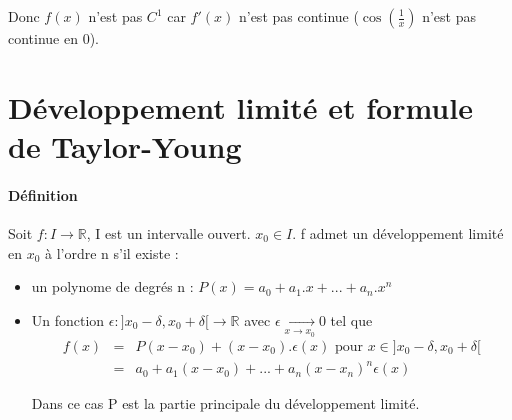 Donc $f(x)$ n'est pas $C^1$ car $f'(x)$ n'est pas continue ($\cos(\frac{1}{x})$ n'est pas continue en 0).

\section{Développement limité et formule de Taylor-Young}

\paragraph{Définition} Soit $f : I \rightarrow \mathbb{R}$, I est un intervalle ouvert. $x_0 \in I$.
f admet un développement limité en $x_0$ à l'ordre n s'il existe : 
\begin{itemize}
	\item un polynome de degrés n : $P(x) = a_0+a_1.x+...+a_n.x^n$
	\item Un fonction $\epsilon : ]x_0-\delta, x_0+\delta[ \rightarrow \mathbb{R}$ avec $\epsilon \xrightarrow[x \to x_0]{} 0$ tel que  \[ \begin{array}{rcl}
			f(x) &=& P(x-x_0)+(x-x_0).\epsilon(x) \text{ pour } x \in ]x_0-\delta, x_0+\delta[ \\
					   &=& a_0+a_1(x-x_0)+...+a_n(x-x_n)^n\epsilon(x) 
	\end{array}\]

	Dans ce cas P est la partie principale du développement limité.
\end{itemize}
